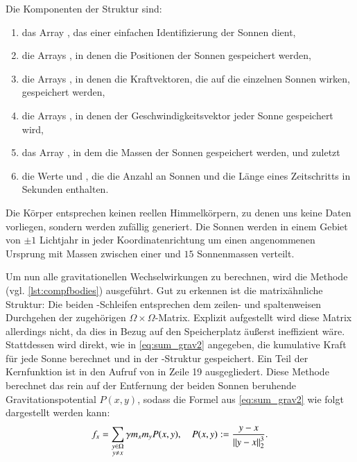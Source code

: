     Die Komponenten der Struktur sind:
    \begin{enumerate}
     \item das Array , das einer einfachen Identifizierung der Sonnen dient,
     \item die Arrays , in denen die Positionen der Sonnen gespeichert werden,
     \item die Arrays , in denen die Kraftvektoren, die auf die einzelnen Sonnen wirken, gespeichert werden,
     \item die Arrays , in denen der Geschwindigkeitsvektor jeder Sonne gespeichert wird,
     \item das Array , in dem die Massen der Sonnen gespeichert werden, und zuletzt
     \item die Werte  und , die die Anzahl an Sonnen und die Länge eines Zeitschritts in Sekunden enthalten.
    \end{enumerate}
    
    Die Körper entsprechen keinen reellen Himmelkörpern, zu denen uns keine Daten vorliegen, sondern werden zufällig generiert. Die Sonnen werden in einem Gebiet von $\pm 1$ Lichtjahr in
    jeder Koordinatenrichtung um einen angenommenen Ursprung mit Massen zwischen einer und $15$ Sonnenmassen verteilt.

    Um nun alle gravitationellen Wechselwirkungen zu berechnen, wird die Methode  (vgl. \autoref{lst:compfbodies}) ausgeführt.
    Gut zu erkennen ist die matrixähnliche Struktur: Die beiden -Schleifen entsprechen dem zeilen- und spaltenweisen Durchgehen der zugehörigen $\Omega \times \Omega$-Matrix. 
    Explizit aufgestellt wird diese Matrix allerdings nicht, da dies in Bezug auf den Speicherplatz äußerst ineffizient wäre. Stattdessen wird direkt, wie in \autoref{eq:sum_grav2}
    angegeben, die kumulative Kraft für jede Sonne berechnet und in der -Struktur gespeichert. Ein Teil der Kernfunktion ist in den Aufruf von 
    in Zeile 19 ausgegliedert. 
    Diese Methode berechnet das rein auf der Entfernung der beiden Sonnen beruhende Gravitationspotential $P(x,y)$, sodass die Formel aus \autoref{eq:sum_grav2} wie folgt dargestellt werden kann:
    \[
      f_x = \sum_{\substack{y \in \Omega \\ y \neq x}} \gamma m_x  m_y P(x, y), \ \ \ \ P(x, y) := \frac{y - x}{\left\lVert y - x\right\rVert^3_2}.
    \]
    
